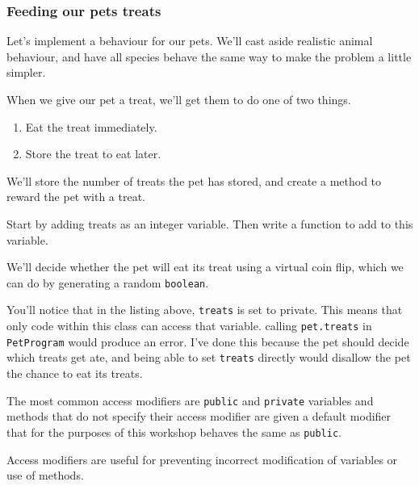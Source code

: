 		\subsubsection{Feeding our pets treats}
	
			Let's implement a behaviour for our pets. We'll cast aside realistic animal behaviour, and have all species behave the same way to make the problem a little simpler.
			
			When we give our pet a treat, we'll get them to do one of two things.
			\begin{enumerate}[nosep]
				\item Eat the treat immediately.
				\item Store the treat to eat later.
			\end{enumerate}
			We'll store the number of treats the pet has stored, and create a method to reward the pet with a treat.
		
			Start by adding treats as an integer variable. Then write a function to add to this variable.
			
			
			
			We'll decide whether the pet will eat its treat using a virtual coin flip, which we can do by generating a random \texttt{boolean}.
			
			
			
			You'll notice that in the listing above, \texttt{treats} is set to private. This means that only code within this class can access that variable. calling \texttt{pet.treats} in \texttt{PetProgram} would produce an error. I've done this because the pet should decide which treats get ate, and being able to set \texttt{treats} directly would disallow the pet the chance to eat its treats.
			
			\begin{aside}
				The most common access modifiers are \texttt{public} and \texttt{private} variables and methods that do not specify their access modifier are given a default modifier that for the purposes of this workshop behaves the same as \texttt{public}.
				
				Access modifiers are useful for preventing incorrect modification of variables or use of methods.
			\end{aside}
			
